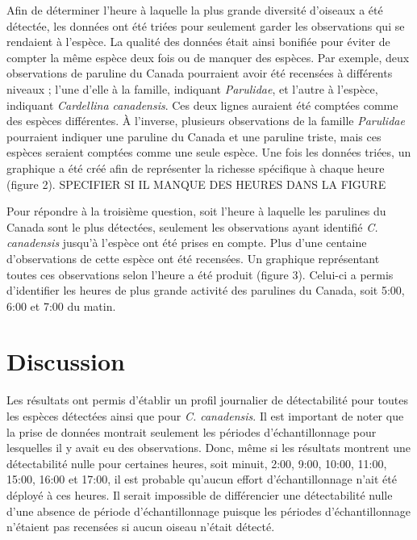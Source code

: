 \documentclass[9pt,twocolumn,twoside,]{pnas-new}
\begin{document}
Afin de déterminer l'heure à laquelle la plus grande diversité d'oiseaux
a été détectée, les données ont été triées pour seulement garder les
observations qui se rendaient à l'espèce. La qualité des données était
ainsi bonifiée pour éviter de compter la même espèce deux fois ou de
manquer des espèces. Par exemple, deux observations de paruline du
Canada pourraient avoir été recensées à différents niveaux ; l'une
d'elle à la famille, indiquant \emph{Parulidae}, et l'autre à l'espèce,
indiquant \emph{Cardellina canadensis}. Ces deux lignes auraient été
comptées comme des espèces différentes. À l'inverse, plusieurs
observations de la famille \emph{Parulidae} pourraient indiquer une
paruline du Canada et une paruline triste, mais ces espèces seraient
comptées comme une seule espèce. Une fois les données triées, un
graphique a été créé afin de représenter la richesse spécifique à chaque
heure (figure 2). SPECIFIER SI IL MANQUE DES HEURES DANS LA FIGURE

Pour répondre à la troisième question, soit l'heure à laquelle les
parulines du Canada sont le plus détectées, seulement les observations
ayant identifié \emph{C. canadensis} jusqu'à l'espèce ont été prises en
compte. Plus d'une centaine d'observations de cette espèce ont été
recensées. Un graphique représentant toutes ces observations selon
l'heure a été produit (figure 3). Celui-ci a permis d'identifier les
heures de plus grande activité des parulines du Canada, soit 5:00, 6:00
et 7:00 du matin.

\hypertarget{discussion}{%
\section*{Discussion}\label{discussion}}

Les résultats ont permis d'établir un profil journalier de détectabilité
pour toutes les espèces détectées ainsi que pour \emph{C. canadensis}.
Il est important de noter que la prise de données montrait seulement les
périodes d'échantillonnage pour lesquelles il y avait eu des
observations. Donc, même si les résultats montrent une détectabilité
nulle pour certaines heures, soit minuit, 2:00, 9:00, 10:00, 11:00,
15:00, 16:00 et 17:00, il est probable qu'aucun effort d'échantillonnage
n'ait été déployé à ces heures. Il serait impossible de différencier une
détectabilité nulle d'une absence de période d'échantillonnage puisque
les périodes d'échantillonnage n'étaient pas recensées si aucun oiseau
n'était détecté.
\end{document}
